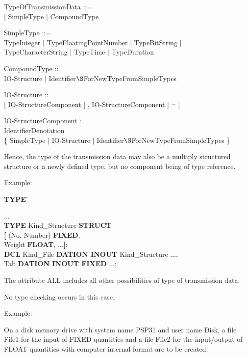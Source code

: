 TypeOfTransmissionData ::=\\
 $\mid$ SimpleType $\mid$ CompoundType

SimpleType ::= \\
\x TypeInteger $\mid$ TypeFloatingPointNumber $\mid$ TypeBitString $\mid$\\
\x TypeCharacterString $\mid$ TypeTime $\mid$ TypeDuration

CompoundType ::= \\
\x IO-Structure $\mid$ Identifier$\S $ForNewTypeFromSimpleTypes

IO-Structure ::=\\
 [ IO-StructureComponent [ , IO-StructureComponent ] $^{...}$ ]

IO-StructureComponent := \\
\x IdentifierDenotation\\
\x \{ SimpleType $\mid$ IO-Structure $\mid$ Identifier$\S $ForNewTypeFromSimpleTypes \}

Hence, the type of the transmission data may also be a multiply
structured structure or a newly defined type, but no component being of
type reference.

Example:

\begin{tabbing}
{\bf TYPE} \= \kill

...        \> \\
{\bf TYPE} \> Kind\_Structure {\bf STRUCT} \\
    \> {\bf [} (No, Number) {\bf FIXED},\\
    \> \x Weight {\bf FLOAT}, ...{\bf ]};\\
{\bf DCL}  \> Kind\_File {\bf DATION INOUT} Kind\_Structure ...,\\
    \> Tab {\bf DATION INOUT FIXED} ...;
\end{tabbing}

The attribute ALL includes all other possibilities of type of
transmission data.
\begin{added}
No type checking occurs in this case.
\end{added}

Example:

On a disk memory drive with system name PSP31 and user name Disk, a file
File1 for the input of FIXED quantities and a file File2 for the
input/output of FLOAT quantities with computer internal format are to be
created.

